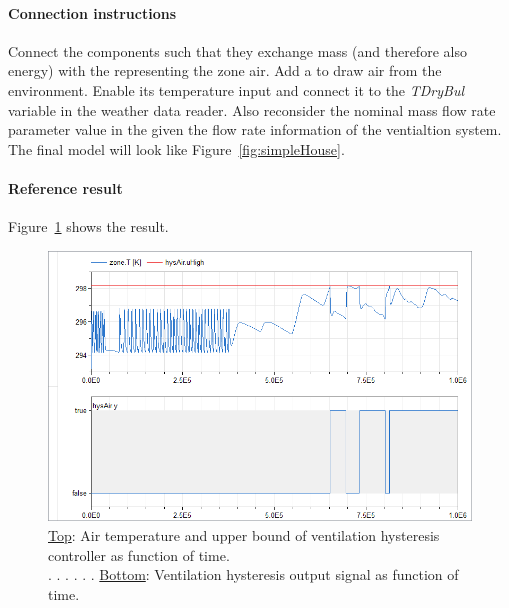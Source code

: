 \documentclass[10pt,a4paper]{article}
\begin{document}
\paragraph{Connection instructions}
Connect the components such that they exchange mass 
(and therefore also energy) with the 
representing the zone air.
Add a  to draw air from the environment.
Enable its temperature input and connect it to the \textit{TDryBul}
variable in the weather data reader. Also reconsider the nominal mass flow rate parameter value in the  given the flow rate information of the ventialtion system. The final model will look like
Figure~\ref{fig:simpleHouse}.

\paragraph{Reference result}
Figure~\ref{fig:res6} shows the result.

\begin{figure}[h!]
\centering
\includegraphics[scale=0.7]{result6.png}
\caption{\underline{Top}: Air temperature and upper bound of ventilation hysteresis controller as function of time. \\ . . . . . . \underline{Bottom}: Ventilation hysteresis output signal as function of time.}
\label{fig:res6}
\end{figure}
\end{document}
